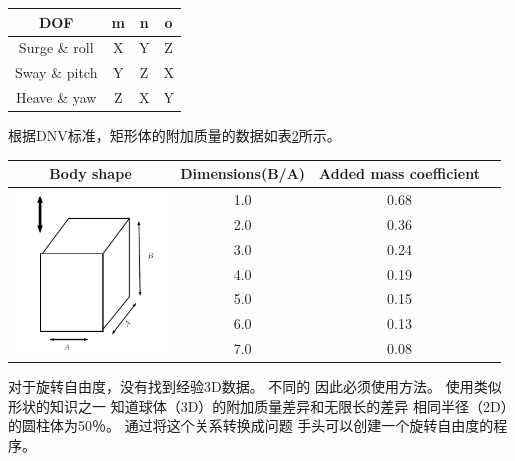 \begin{table}
\centering
\label{tab:chap4:table1}
\begin{tabular}{cccc}
\toprule
 DOF            & m & n & o\\
\midrule
 Surge \& roll  & X  &Y   &Z   \\
 Sway  \& pitch &  Y &Z   &X   \\
 Heave \& yaw   &Z   &X   &Y   \\
\bottomrule
\end{tabular}
\end{table}

根据DNV标准\cite{DNVStard}，矩形体的附加质量的数据如表\ref{tab:chap4:table2}所示。

\begin{table}
\centering
\label{tab:chap4:table2}
\begin{tabular}{cccc}
\toprule
 Body shape  & Dimensions(B/A) & Added mass coefficient\\
\midrule
\multirow{7}{4cm}{\includegraphics[width = 4cm]{figure/chap4/T2_f.png}}
 & 1.0   &0.68    \\
 & 2.0   &0.36    \\
 & 3.0   &0.24    \\
 & 4.0   &0.19    \\
 & 5.0   &0.15    \\
 & 6.0   &0.13    \\
 & 7.0   &0.08    \\
\bottomrule
\end{tabular}
\end{table}


对于旋转自由度，没有找到经验3D数据。 不同的
因此必须使用方法。 使用类似形状的知识之一
知道球体（3D）的附加质量差异和无限长的差异
相同半径（2D）的圆柱体为50％\cite{bertram2012practical}。 通过将这个关系转换成问题
手头可以创建一个旋转自由度的程序。

